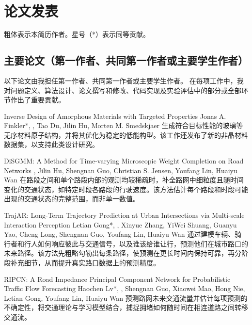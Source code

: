\label{sec:pub}
\section*{论文发表}
粗体表示本简历作者。星号（*）表示同等贡献。

\subsection*{主要论文（第一作者、共同第一作者或主要学生作者）}
以下论文由我担任第一作者、共同第一作者或主要学生作者。
在每项工作中，我对问题定义、算法设计、论文撰写和修改、代码实现及实验评估中的部分或全部环节作出了重要贡献。

{Inverse Design of Amorphous Materials with Targeted Properties}
{Jonas A. Finkler*, \me*, Tao Du, Jilin Hu, Morten M. Smedskjaer}
{生成符合目标性能的玻璃等无序材料原子结构，并将其优化为稳定的低能构型。该工作还发布了新的非晶材料数据集，以支持此类设计研究。}

{DiSGMM: A Method for Time-varying Microscopic Weight Completion on Road Networks}
{\me, Jilin Hu, Shengnan Guo, Christian S. Jensen, Youfang Lin, Huaiyu Wan}
{在路段之间和单个路段内部的观测均较稀疏时，补全路网中细粒度且随时间变化的交通状态，如特定时段各路段的行驶速度。该方法估计每个路段和时段可能出现的交通状态的完整范围，而非单一数值。}

{TrajAR: Long-Term Trajectory Prediction at Urban Intersections via Multi-scale Interaction Perception}
{Letian Gong*, \me*, Xinyue Zhang, YiWei Shuang, Guanyu Yao, Cheng Long, Shengnan Guo, Youfang Lin, Huaiyu Wan}
{通过建模车辆、骑行者和行人如何响应彼此与交通信号，以及谁该给谁让行，预测他们在城市路口的未来路径。该方法先粗略勾勒出每条路径，使预测在更长时间内保持可靠，再分阶段补充细节，从而提升真实路口数据上的预测精度。}

{RIPCN: A Road Impedance Principal Component Network for Probabilistic Traffic Flow Forecasting}
{Haochen Lv*, \me*, Shengnan Guo, Xiaowei Mao, Hong Nie, Letian Gong, Youfang Lin, Huaiyu Wan}
{预测路网未来交通流量并估计每项预测的不确定性，将交通理论与学习模型结合，捕捉拥堵如何随时间在相连道路之间转移交通流。}

